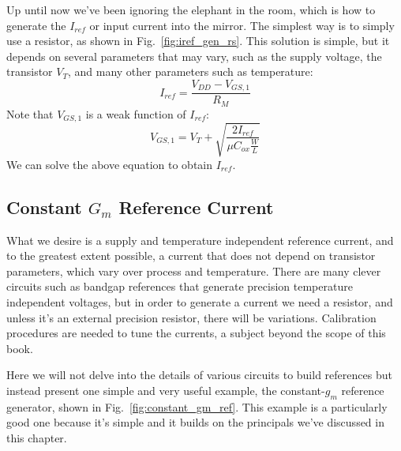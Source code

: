 Up until now we've been ignoring the elephant in the room, which is how to generate the $I_{ref}$ or input current into the mirror.  The simplest way is to simply use a resistor, as shown in Fig.~\ref{fig:iref_gen_rs}.  This solution is simple, but it depends on several parameters that may vary, such as the supply voltage, the transistor $V_T$, and many other parameters such as temperature:  
%
\begin{equation}
	I_{ref} = \frac{V_{DD} - V_{GS,1}}{R_M}  
\end{equation}
%
Note that $V_{GS,1}$ is a weak function of $I_{ref}$:
%
\begin{equation}
	V_{GS,1} = V_T + \sqrt{\frac{2 I_{ref}}{\mu C_{ox} \frac{W}{L}}}
\end{equation}
%
We can solve the above equation to obtain $I_{ref}$.

\subsection{Constant $G_m$ Reference Current}

What we desire is a supply and temperature independent reference current, and to the greatest extent possible, a current that does not depend on transistor parameters, which vary over process and temperature.  There are many clever circuits such as bandgap references that generate precision temperature independent voltages, but in order to generate a current we need a resistor, and unless it's an external precision resistor, there will be variations.  Calibration procedures are needed to tune the currents, a subject beyond the scope of this book.

Here we will not delve into the details of various circuits to build references but instead present one simple and very useful example, the constant-$g_m$ reference generator, shown in Fig.~\ref{fig:constant_gm_ref}.  This example is a particularly good one because it's simple and it builds on the principals we've discussed in this chapter.


